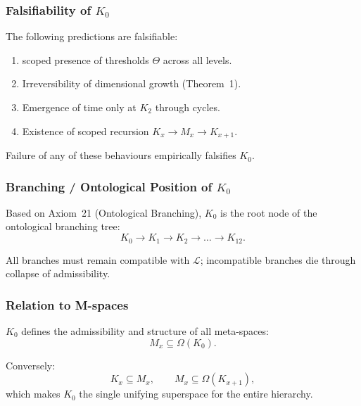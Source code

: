 \subsubsection{Falsifiability of \texorpdfstring{$K_0$}{K_0}}

The following predictions are falsifiable:
\begin{enumerate}
    \item scoped presence of thresholds $\Theta$ across all levels.
    \item Irreversibility of dimensional growth (Theorem~1).
    \item Emergence of time only at $K_2$ through cycles.
    \item Existence of scoped recursion $K_x\to M_x\to K_{x+1}$.
\end{enumerate}

Failure of any of these behaviours empirically falsifies $K_0$.

\subsubsection{Branching / Ontological Position of \texorpdfstring{$K_0$}{K_0}}

Based on Axiom~21 (Ontological Branching), $K_0$ is the root node of the
ontological branching tree:
\[
K_0 \rightarrow K_1 \rightarrow K_2 \rightarrow \dots \rightarrow K_{12}.
\]

All branches must remain compatible with $\mathcal{L}$; incompatible
branches die through collapse of admissibility.

\subsubsection{Relation to M-spaces}

$K_0$ defines the admissibility and structure of all meta-spaces:
\[
M_x \subseteq \Omega(K_0).
\]

Conversely:
\[
K_x \subseteq M_x,
\qquad
M_x \subseteq \Omega(K_{x+1}),
\]
which makes $K_0$ the single unifying superspace for the entire
hierarchy.
